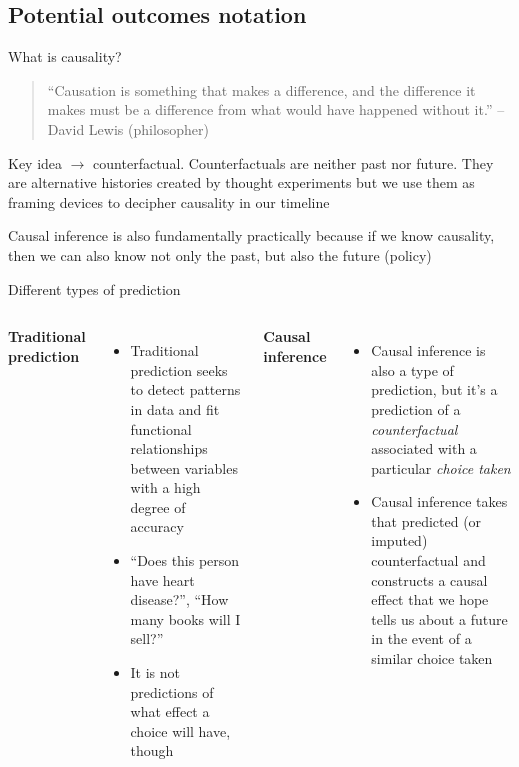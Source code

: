 \documentclass{beamer}
\begin{document}
\subsection{Potential outcomes notation}

\begin{frame}{What is causality?}

  \begin{quote}
    ``Causation is something that makes a difference, and the difference it makes must be a difference from what would have happened without it.'' -- David Lewis (philosopher)
  \end{quote}

  \bigskip
  Key idea $\rightarrow$ counterfactual. Counterfactuals are neither past nor future.  They are alternative histories created by thought experiments but we use them as framing devices to decipher causality in our timeline

  \bigskip

  Causal inference is also fundamentally practically because if we know causality, then we can also know not only the past, but also the future (policy)

\end{frame}

\begin{frame}{Different types of prediction}

  \begin{columns}
    \centering
    \textbf{Traditional prediction}
    \begin{itemize}
      \item Traditional prediction seeks to detect patterns in data and fit functional relationships between variables with a high degree of accuracy
      \item ``Does this person have heart disease?'', ``How many books will I sell?''
      \item It is not predictions of what effect a choice will have, though
    \end{itemize}
    \centering
    \textbf{Causal inference}
    \begin{itemize}
      \item Causal inference is also a type of prediction, but it's a prediction of a \emph{counterfactual} associated with a particular \emph{choice taken}
      \item Causal inference takes that predicted (or imputed) counterfactual and constructs a causal effect that we hope tells us about a future in the event of a similar choice taken
    \end{itemize}
  \end{columns}
\end{frame}
\end{document}
